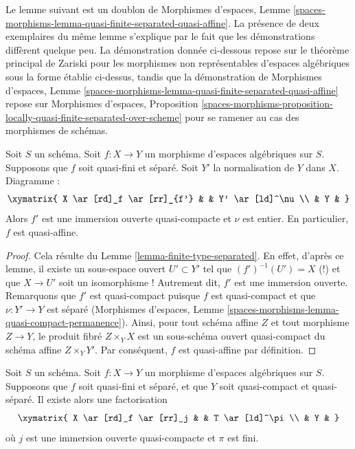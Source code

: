 \noindent
Le lemme suivant est un doublon de
Morphismes d'espaces, Lemme
\ref{spaces-morphisms-lemma-quasi-finite-separated-quasi-affine}.
La présence de deux exemplaires du même lemme s'explique par le fait que les
démonstrations diffèrent quelque peu. La démonstration donnée ci-dessous
repose sur le théorème principal de Zariski pour les morphismes non représentables
d'espaces algébriques sous la forme établie ci-dessus, tandis que la démonstration de
Morphismes d'espaces, Lemme
\ref{spaces-morphisms-lemma-quasi-finite-separated-quasi-affine}
repose sur Morphismes d'espaces, Proposition
\ref{spaces-morphisms-proposition-locally-quasi-finite-separated-over-scheme}
pour se ramener au cas des morphismes de schémas.

\begin{lemma}
\label{lemma-quasi-finite-separated-quasi-affine}
Soit $S$ un schéma.
Soit $f : X \to Y$ un morphisme d'espaces algébriques sur $S$.
Supposons que $f$ soit quasi-fini et séparé.
Soit $Y'$ la normalisation de $Y$ dans $X$.
Diagramme :
$$
\xymatrix{
X \ar[rd]_f \ar[rr]_{f'} & & Y' \ar[ld]^\nu \\
& Y &
}
$$
Alors $f'$ est une immersion ouverte quasi-compacte et $\nu$ est entier.
En particulier, $f$ est quasi-affine.
\end{lemma}

\begin{proof}
Cela résulte du Lemme \ref{lemma-finite-type-separated}. En effet, d'après
ce lemme, il existe un sous-espace ouvert $U' \subset Y'$ tel que
$(f')^{-1}(U') = X$ (!) et que $X \to U'$ soit un isomorphisme ! Autrement
dit, $f'$ est une immersion ouverte. Remarquons que $f'$ est quasi-compact puisque
$f$ est quasi-compact et que $\nu : Y' \to Y$ est séparé
(Morphismes d'espaces, Lemme
\ref{spaces-morphisms-lemma-quasi-compact-permanence}).
Ainsi, pour tout schéma affine $Z$ et tout morphisme $Z \to Y$, le
produit fibré $Z \times_Y X$ est un sous-schéma ouvert quasi-compact
du schéma affine $Z \times_Y Y'$. Par conséquent, $f$ est quasi-affine par
définition.
\end{proof}

\begin{lemma}
\label{lemma-quasi-finite-separated-pass-through-finite}
Soit $S$ un schéma.
Soit $f : X \to Y$ un morphisme d'espaces algébriques sur $S$.
Supposons que $f$ soit quasi-fini et séparé, et que
$Y$ soit quasi-compact et quasi-séparé. Il existe alors
une factorisation
$$
\xymatrix{
X \ar[rd]_f \ar[rr]_j & & T \ar[ld]^\pi \\
& Y &
}
$$
où $j$ est une immersion ouverte quasi-compacte et $\pi$ est fini.
\end{lemma}

